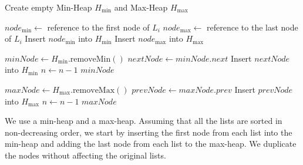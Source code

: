 \documentclass[12pt]{article}
\newenvironment{pseudocode}
{
  \mdframed
  \algorithmic[1]
}
{
  \endalgorithmic
  \endmdframed
}
\begin{document}
    \begin{pseudocode}
        \State Create empty Min-Heap $H_{\text{min}}$ and Max-Heap $H_{\text{max}}$
        
            \State $node_{\text{min}} \gets$ reference to the first node of $L_i$
            \State $node_{\text{max}} \gets$ reference to the last node of $L_i$
            \State Insert $node_{\text{min}}$ into $H_{\text{min}}$
            \State Insert $node_{\text{max}}$ into $H_{\text{max}}$
        \EndFor
        
        \State {}
        \State {}
    \EndFunction

    \Statex

            \State \Return {} 
        \Else
            \State $minNode \gets H_{\text{min}}.\text{removeMin}()$ 
            \State $nextNode \gets minNode.next$ 
             
                \State Insert $nextNode$ into $H_{\text{min}}$ 
            \EndIf
            \State $n \gets n - 1$
            \State \Return {} $minNode$
        \EndIf
    \EndFunction

    \Statex

            \State \Return {}
        \Else
            \State $maxNode \gets H_{\text{max}}.\text{removeMax}()$ 
            \State $prevNode \gets maxNode.prev$
             
                \State Insert $prevNode$ into $H_{\text{max}}$ 
            \EndIf
            \State $n \gets n - 1$
            \State \Return {} $maxNode$
        \EndIf
    \EndFunction

    \end{pseudocode}

    We use a min-heap and a max-heap. Assuming that all the lists are sorted in non-decreasing order, we start by inserting the first node from each list into the min-heap and adding the last node from each list to the max-heap. We duplicate the nodes without affecting the original lists.
\end{document}

